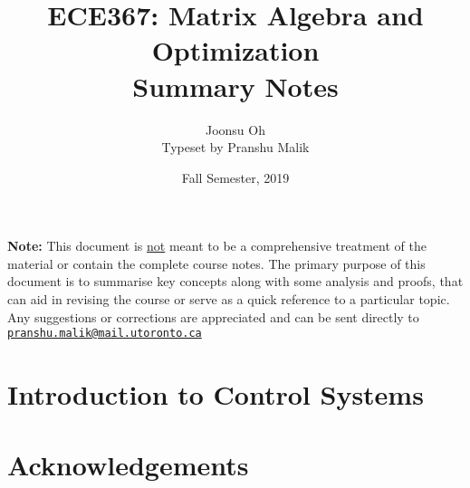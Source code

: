 \documentclass[10pt]{article}
\date{Fall Semester, 2019}
\begin{document}
\title{\textbf{\Large{\textsc{ECE367:} Matrix Algebra and Optimization}} \\ \Large{Summary Notes}\vspace{-0.3cm}}
\author{Joonsu Oh\\\footnotesize Typeset by Pranshu Malik}

\maketitle
\tableofcontents
\blfootnote
{
    \textbf{Note:} This document is \underline{not} meant to be a comprehensive treatment of the material 
    or contain the complete course notes. The primary purpose of this document is to summarise key concepts
    along with some analysis and proofs, that can aid in revising the course or serve as a quick reference 
    to a particular topic. Any suggestions or corrections are appreciated and can be
    sent directly to \texttt{\href{mailto:pranshu.malik@mail.utoronto.ca}{pranshu.malik@mail.utoronto.ca}}
}

\section{Introduction to Control Systems}

\section{Acknowledgements}
\end{document}
